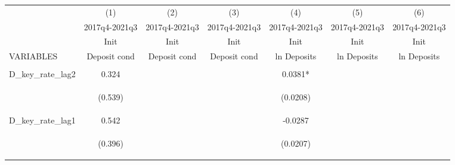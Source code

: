 \documentclass[]{article}
\begin{document}
\begin{center}
\begin{tabular}{lcccccc} \hline
 & (1) & (2) & (3) & (4) & (5) & (6) \\
 & 2017q4-2021q3 & 2017q4-2021q3 & 2017q4-2021q3 & 2017q4-2021q3 & 2017q4-2021q3 & 2017q4-2021q3 \\
 & Init & Init & Init & Init & Init & Init \\
VARIABLES & Deposit cond & Deposit cond & Deposit cond & ln Deposits & ln Deposits & ln Deposits \\ \hline
\vspace{4pt} & \begin{footnotesize}\end{footnotesize} & \begin{footnotesize}\end{footnotesize} & \begin{footnotesize}\end{footnotesize} & \begin{footnotesize}\end{footnotesize} & \begin{footnotesize}\end{footnotesize} & \begin{footnotesize}\end{footnotesize} \\
D\_key\_rate\_lag2 & 0.324 &  &  & 0.0381* &  &  \\
\vspace{4pt} & \begin{footnotesize}(0.539)\end{footnotesize} & \begin{footnotesize}\end{footnotesize} & \begin{footnotesize}\end{footnotesize} & \begin{footnotesize}(0.0208)\end{footnotesize} & \begin{footnotesize}\end{footnotesize} & \begin{footnotesize}\end{footnotesize} \\
D\_key\_rate\_lag1 & 0.542 &  &  & -0.0287 &  &  \\
\vspace{4pt} & \begin{footnotesize}(0.396)\end{footnotesize} & \begin{footnotesize}\end{footnotesize} & \begin{footnotesize}\end{footnotesize} & \begin{footnotesize}(0.0207)\end{footnotesize} & \begin{footnotesize}\end{footnotesize} & \begin{footnotesize}\end{footnotesize} \\

\end{tabular}
\end{center}
\end{document}
